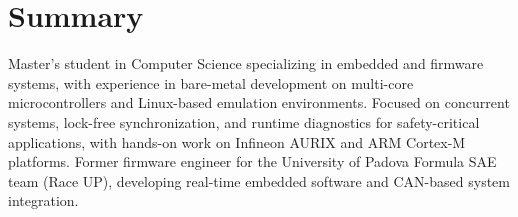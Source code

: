 \section{Summary}
Master’s student in Computer Science specializing in embedded and firmware systems,
with experience in bare-metal development on multi-core microcontrollers and Linux-based
emulation environments.
Focused on concurrent systems, lock-free synchronization, and runtime diagnostics for
safety-critical applications, with hands-on work on Infineon AURIX and ARM Cortex-M platforms.
Former firmware engineer for the University of Padova Formula SAE team (Race UP),
developing real-time embedded software and CAN-based system integration.
